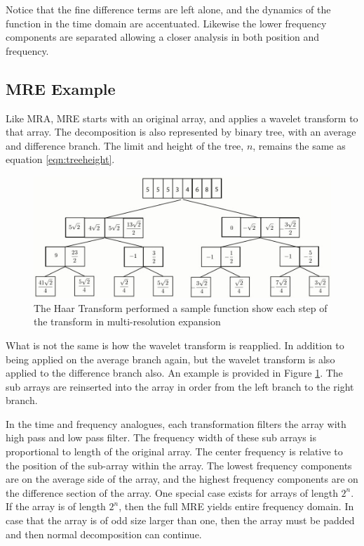 Notice that the fine difference terms are left alone, and the dynamics
of the function in the time domain are accentuated.  Likewise the
lower frequency components are separated allowing a closer analysis in
both position and frequency.


\subsection {MRE Example}

Like MRA, MRE starts with an original array, and applies a wavelet transform to that array.  The decomposition is also represented by binary tree, with an average and difference branch.  The limit and height of the tree, $n$, remains the same as equation \ref{eqn:treeheight}.

\begin{figure}
\includegraphics [width=6in]{numexample01_2.jpg}
\caption{The Haar Transform performed a sample function show each step of the transform in multi-resolution expansion }
\label{nummre}
\end{figure}

What is not the same is how the wavelet transform is reapplied.  In
addition to being applied on the average branch again, but the wavelet
transform is also applied to the difference branch also.  An example
is provided in Figure \ref{nummre}. The sub arrays are reinserted into
the array in order from the left branch to the right branch.

In the time and frequency analogues, each transformation filters the
array with high pass and low pass filter.  The frequency width of
these sub arrays is proportional to length of the original array.  The
center frequency is relative to the position of the sub-array within
the array.  The lowest frequency components are on the average side of
the array, and the highest frequency components are on the difference
section of the array.  One special case exists for arrays of length
$2^n$.  If the array is of length $2^n$, then the full MRE yields
entire frequency domain.  In case that the array is of odd size larger
than one, then the array must be padded and then normal decomposition
can continue.

